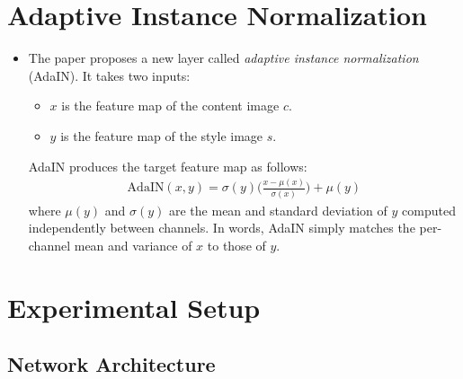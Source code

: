 \documentclass[10pt]{article}
\begin{document}
  \section{Adaptive Instance Normalization}

  \begin{itemize}
  	\item The paper proposes a new layer called \emph{adaptive instance normalization} (AdaIN). It takes two inputs:
  	\begin{itemize}
  		\item $x$ is the feature map of the content image $c$.
  		\item $y$ is the feature map of the style image $s$.
  	\end{itemize}
  	AdaIN produces the target feature map as follows:
  	\begin{align*}
  		\mathrm{AdaIN}(x,y) = \sigma(y) \bigg( \frac{x - \mu(x)}{\sigma(x)} \bigg) + \mu(y)
  	\end{align*}
  	where $\mu(y)$ and $\sigma(y)$ are the mean and standard deviation of $y$ computed independently between channels. In words, AdaIN simply matches the per-channel mean and variance of $x$ to those of $y$.  	
  \end{itemize}

  \section{Experimental Setup}

  \subsection{Network Architecture}
\end{document}

